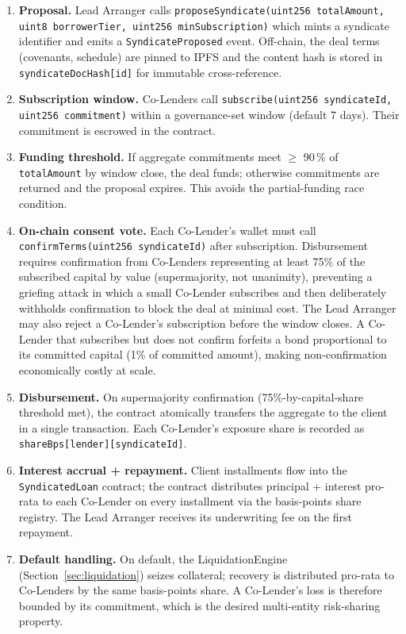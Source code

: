\documentclass[12pt,a4paper]{report}
\begin{document}
\begin{enumerate}[noitemsep]
\item \textbf{Proposal.} Lead Arranger calls \texttt{proposeSyndicate(uint256 totalAmount, uint8 borrowerTier, uint256 minSubscription)} which mints a syndicate identifier and emits a \texttt{SyndicateProposed} event. Off-chain, the deal terms (covenants, schedule) are pinned to IPFS and the content hash is stored in \texttt{syndicateDocHash[id]} for immutable cross-reference.
\item \textbf{Subscription window.} Co-Lenders call \texttt{subscribe(uint256 syndicateId, uint256 commitment)} within a governance-set window (default 7 days). Their commitment is escrowed in the contract.
\item \textbf{Funding threshold.} If aggregate commitments meet $\ge$ 90\,\% of \texttt{totalAmount} by window close, the deal funds; otherwise commitments are returned and the proposal expires. This avoids the partial-funding race condition.
\item \textbf{On-chain consent vote.} Each Co-Lender's wallet must call \texttt{confirmTerms(uint256 syndicateId)} after subscription. Disbursement requires confirmation from Co-Lenders representing at least 75\% of the subscribed capital by value (supermajority, not unanimity), preventing a griefing attack in which a small Co-Lender subscribes and then deliberately withholds confirmation to block the deal at minimal cost. The Lead Arranger may also reject a Co-Lender's subscription before the window closes. A Co-Lender that subscribes but does not confirm forfeits a bond proportional to its committed capital (1\% of committed amount), making non-confirmation economically costly at scale.
\item \textbf{Disbursement.} On supermajority confirmation (75\%-by-capital-share threshold met), the contract atomically transfers the aggregate to the client in a single transaction. Each Co-Lender's exposure share is recorded as \texttt{shareBps[lender][syndicateId]}.
\item \textbf{Interest accrual + repayment.} Client installments flow into the \texttt{SyndicatedLoan} contract; the contract distributes principal + interest pro-rata to each Co-Lender on every installment via the basis-points share registry. The Lead Arranger receives its underwriting fee on the first repayment.
\item \textbf{Default handling.} On default, the LiquidationEngine (Section~\ref{sec:liquidation}) seizes collateral; recovery is distributed pro-rata to Co-Lenders by the same basis-points share. A Co-Lender's loss is therefore bounded by its commitment, which is the desired multi-entity risk-sharing property.
\end{enumerate}
\end{document}
